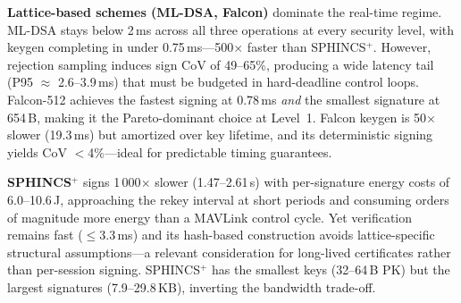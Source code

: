 \textbf{Lattice-based schemes (ML-DSA, Falcon)} dominate the
real-time regime.  ML-DSA stays below 2\,ms across all three
operations at every security level, with keygen completing in
under 0.75\,ms---500$\times$ faster than SPHINCS$^+$.  However,
rejection sampling induces sign CoV of 49--65\%, producing a wide
latency tail (P95 $\approx$ 2.6--3.9\,ms) that must be budgeted in
hard-deadline control loops.  Falcon-512 achieves the fastest
signing at 0.78\,ms \emph{and} the smallest signature at 654\,B,
making it the Pareto-dominant choice at Level~1.  Falcon keygen is
50$\times$ slower (19.3\,ms) but amortized over key lifetime, and
its deterministic signing yields CoV $<$4\%---ideal for
predictable timing guarantees.

\textbf{SPHINCS$^+$} signs 1\,000$\times$ slower (1.47--2.61\,s)
with per-signature energy costs of 6.0--10.6\,J, approaching the
rekey interval at short periods and consuming orders of magnitude
more energy than a MAVLink control cycle.  Yet verification remains
fast ($\leq$3.3\,ms) and its hash-based construction avoids
lattice-specific structural assumptions---a relevant consideration
for long-lived certificates rather than per-session signing.
SPHINCS$^+$ has the smallest keys (32--64\,B PK) but the largest
signatures (7.9--29.8\,KB), inverting the bandwidth trade-off.

